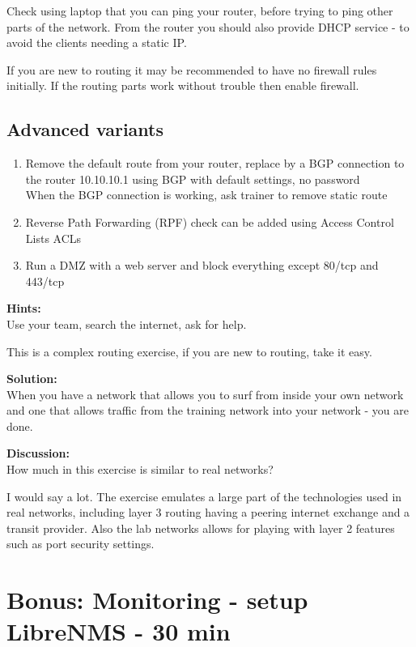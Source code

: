 \documentclass[a4paper,11pt,notitlepage]{report}
\begin{document}
Check using laptop that you can ping your router, before trying to ping other parts of the network. From the router you should also provide DHCP service - to avoid the clients needing a static IP.

If you are new to routing it may be recommended to have no firewall rules initially. If the routing parts work without trouble then enable firewall.

\section*{Advanced variants}
\begin{enumerate}
\item Remove the default route from your router, replace by a BGP connection to the router 10.10.10.1 using BGP with default settings, no password\\
When the BGP connection is working, ask trainer to remove static route
\item Reverse Path Forwarding (RPF) check can be added using Access Control Lists ACLs
\item Run a DMZ with a web server and block everything except 80/tcp and 443/tcp
\end{enumerate}


{\bf Hints:}\\
Use your team, search the internet, ask for help.

This is a complex routing exercise, if you are new to routing, take it easy.

{\bf Solution:}\\
When you have a network that allows you to surf from inside your own network and one that allows traffic from the training network into your network - you are done.

{\bf Discussion:}\\
How much in this exercise is similar to real networks?

I would say a lot. The exercise emulates a large part of the technologies used in real networks, including layer 3 routing having a peering internet exchange and a transit provider. Also the lab networks allows for playing with layer 2 features such as port security settings.

\chapter{Bonus: Monitoring - setup LibreNMS - 30 min}
\label{ex:librenms-setup}
\end{document}
